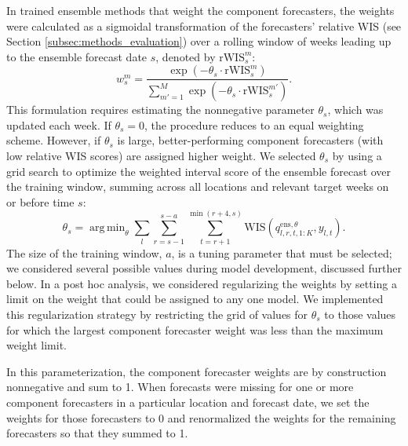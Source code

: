 \documentclass[11pt,3p,authoryear]{elsarticle}
\DeclareMathOperator*{\argmin}{arg\,min}
\def\ens{\mathrm{ens}}
\def\WIS{\mathrm{WIS}}
\def\rWIS{\mathrm{rWIS}}
\begin{document}

In trained ensemble methods that weight the component forecasters, the weights were calculated as a sigmoidal transformation of the forecasters' relative WIS (see Section \ref{subsec:methods_evaluation}) over a rolling window of weeks leading up to the ensemble forecast date $s$, denoted by $\rWIS^{m}_{s}$:
$$
w^m_{s} = \frac{\exp(-\theta_s \cdot \rWIS^{m}_{s} )}{\sum_{m' = 1}^M \exp(-\theta_s \cdot \rWIS^{m'}_{s} )}.
$$
This formulation requires estimating the nonnegative parameter $\theta_s$, which was updated each week.
If $\theta_s = 0$, the procedure reduces to an equal weighting scheme.
However, if $\theta_s$ is large, better-performing component forecasters (with low relative WIS scores) are assigned higher weight.
We selected $\theta_s$ by using a grid search to optimize the weighted interval score of the ensemble forecast over the training window, summing across all locations and relevant target weeks on or before time $s$:
$$
\theta_s = \argmin_\theta \sum_{l} \sum_{r = s - 1}^{s-a} \sum_{t = r + 1}^{\min(r + 4, s)} \WIS(q^{\ens, \theta}_{l,r,t,1:K}, y_{l,t}).
$$
The size of the training window, $a$, is a tuning parameter that must be selected; we considered several possible values during model development, discussed further below.
In a post hoc analysis, we considered regularizing the weights by setting a limit on the weight that could be assigned to any one model.
We implemented this regularization strategy by restricting the grid of values for $\theta_s$ to those values for which the largest component forecaster weight was less than the maximum weight limit.

In this parameterization, the component forecaster weights are by construction nonnegative and sum to 1. When forecasts were missing for one or more component forecasters in a particular location and forecast date, we set the weights for those forecasters to 0 and renormalized the weights for the remaining forecasters so that they summed to 1.
\end{document}
